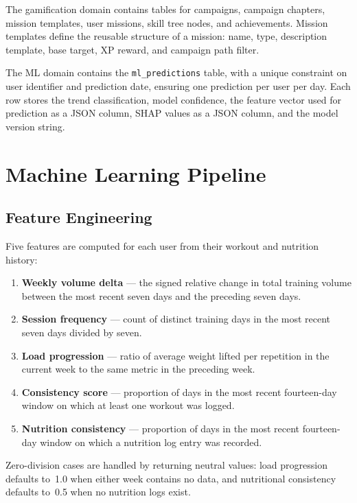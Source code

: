 \documentclass[12pt, a4paper]{report}
\begin{document}
The gamification domain contains tables for campaigns, campaign chapters, mission templates, user missions, skill tree nodes, and achievements. Mission templates define the reusable structure of a mission: name, type, description template, base target, XP reward, and campaign path filter.

The ML domain contains the \texttt{ml\_predictions} table, with a unique constraint on user identifier and prediction date, ensuring one prediction per user per day. Each row stores the trend classification, model confidence, the feature vector used for prediction as a JSON column, SHAP values as a JSON column, and the model version string.

\section{Machine Learning Pipeline}

\subsection{Feature Engineering}

Five features are computed for each user from their workout and nutrition history:

\begin{enumerate}
  \item \textbf{Weekly volume delta} — the signed relative change in total training volume between the most recent seven days and the preceding seven days.
  \item \textbf{Session frequency} — count of distinct training days in the most recent seven days divided by seven.
  \item \textbf{Load progression} — ratio of average weight lifted per repetition in the current week to the same metric in the preceding week.
  \item \textbf{Consistency score} — proportion of days in the most recent fourteen-day window on which at least one workout was logged.
  \item \textbf{Nutrition consistency} — proportion of days in the most recent fourteen-day window on which a nutrition log entry was recorded.
\end{enumerate}

Zero-division cases are handled by returning neutral values: load progression defaults to~1.0 when either week contains no data, and nutritional consistency defaults to~0.5 when no nutrition logs exist.
\end{document}
